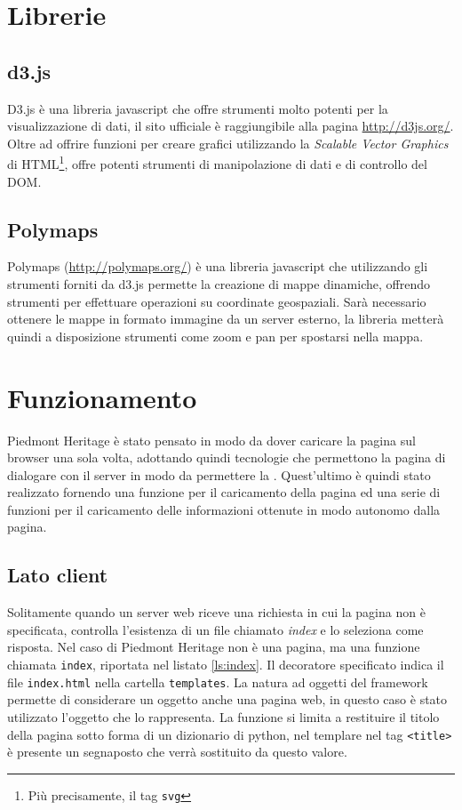 \section{Librerie}
\subsection{d3.js}\label{sec:d3}
D3.js è una libreria javascript che offre strumenti molto potenti per la visualizzazione di dati, il sito ufficiale è raggiungibile alla pagina \url{http://d3js.org/}. Oltre ad offrire funzioni per creare grafici utilizzando la \emph{Scalable Vector Graphics} di HTML\footnote{Più precisamente, il tag \texttt{svg}}, offre potenti strumenti di manipolazione di dati e di controllo del DOM.
		
\subsection{Polymaps}\label{sec:polymaps}
Polymaps (\url{http://polymaps.org/}) è una libreria javascript che utilizzando gli strumenti forniti da d3.js permette la creazione di mappe dinamiche, offrendo strumenti per effettuare operazioni su coordinate geospaziali. Sarà necessario ottenere le mappe in formato immagine da un server esterno, la libreria metterà quindi a disposizione strumenti come zoom e pan per spostarsi nella mappa.

			
\section{Funzionamento}%
Piedmont Heritage è stato pensato in modo da dover caricare la pagina sul browser una sola volta, adottando quindi tecnologie che permettono la pagina di dialogare con il server in modo da permettere la . Quest'ultimo è quindi stato realizzato fornendo una funzione per il caricamento della pagina ed una serie di funzioni per il caricamento delle informazioni ottenute in modo autonomo dalla pagina.
\subsection{Lato client}
Solitamente quando un server web riceve una richiesta in cui la pagina non è specificata, controlla l'esistenza di un file chiamato \emph{index} e lo seleziona come risposta. Nel caso di Piedmont Heritage non è una pagina, ma una funzione chiamata \texttt{index}, riportata nel listato \ref{ls:index}. Il decoratore specificato indica il file \texttt{index.html} nella cartella \texttt{templates}. La natura ad oggetti del framework permette di considerare un oggetto anche una pagina web, in questo caso è stato utilizzato l'oggetto che lo rappresenta. La funzione si limita a restituire il titolo della pagina sotto forma di un dizionario di python, nel templare nel tag \texttt{<title>} è presente un segnaposto che verrà sostituito da questo valore.

